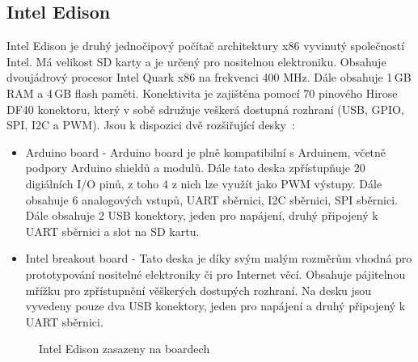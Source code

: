 		
		\subsection{Intel Edison} 
		Intel Edison je druhý jednočipový počítač architektury x86 vyvinutý společností Intel. Má velikost SD karty a je určený pro nositelnou elektroniku. Obsahuje dvoujádrový procesor Intel Quark x86 na frekvenci 400 MHz. Dále obsahuje 1\,GB RAM a 4\,GB flash paměti. Konektivita je zajištěna pomocí 70 pinového Hirose DF40 konektoru, který v sobě sdružuje veškerá dostupná rozhraní (USB, GPIO, SPI, I2C a PWM). Jsou k dispozici dvě rozšiřující desky~\cite{IntelEdison}:
			
			\begin{itemize}
				\item Arduino board - Arduino board je plně kompatibilní s Arduinem, včetně podpory Arduino shieldů a modulů. Dále tato deska zpřístupňuje 20 digiálních I/O pinů, z toho 4 z nich lze využít jako PWM výstupy. Dále obsahuje 6 analogových vstupů, UART sběrnici, I2C sběrnici, SPI sběrnici. Dále obsahuje 2 USB konektory, jeden pro napájení, druhý připojený k UART sběrnici a slot na SD kartu.
				\item Intel breakout board -  Tato deska je díky svým malým rozměrům vhodná pro prototypování nositelné elektroniky či pro Internet věcí. Obsahuje pájitelnou mřížku pro zpřístupnění věškerých dostupých rozhraní. Na desku jsou vyvedeny pouze dva USB konektory, jeden pro napájení a druhý připojený k UART sběrnici.
\end{itemize}


\begin{figure}[!ht]
    \vspace{-20pt}
		\centering
			\hspace*{5mm}
		\caption{Intel Edison zasazeny na boardech}
		\vspace{-10pt}
\end{figure}
	

